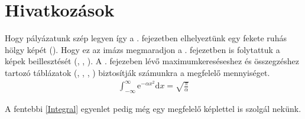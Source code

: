 \section{Hivatkozások}
\hspace{2mm} Hogy pályázatunk szép legyen így a . fejezetben elhelyeztünk egy fekete ruhás hölgy képét (). Hogy ez az imázs megmaradjon a . fejezetben is folytattuk a képek beillesztését (, , ). A . fejezeben lévő  maximumkereséseshez és összegzéshez tartozó táblázatok (, , , ) biztosítják számunkra a megfelelő mennyiséget. 
\begin{align}
\label{eq:Integral}
\int_{-\infty}^\infty \mathrm{e}^{-\alpha x^2} \mathrm{d}x = \sqrt{\frac{\pi}{\alpha}}
\end{align}

A fentebbi \eqref{Integral} egyenlet pedig még egy megfelelő képlettel is szolgál nekünk. 